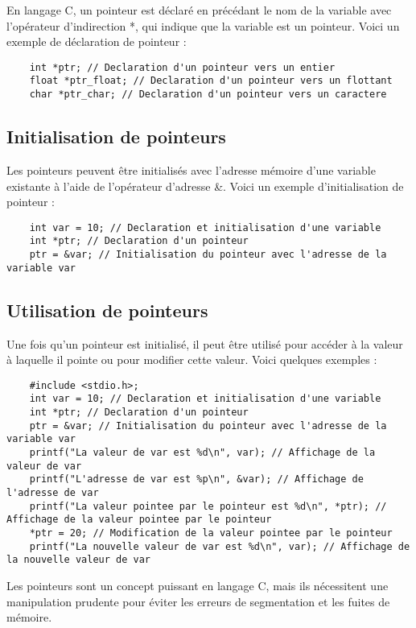 En langage C, un pointeur est déclaré en précédant le nom de la variable avec l'opérateur d'indirection *, qui indique que la variable est un pointeur. Voici un exemple de déclaration de pointeur :

\begin{lstlisting}
	int *ptr; // Declaration d'un pointeur vers un entier
	float *ptr_float; // Declaration d'un pointeur vers un flottant
	char *ptr_char; // Declaration d'un pointeur vers un caractere
\end{lstlisting}

\subsection{Initialisation de pointeurs}

Les pointeurs peuvent être initialisés avec l'adresse mémoire d'une variable existante à l'aide de l'opérateur d'adresse \&. Voici un exemple d'initialisation de pointeur :

\begin{lstlisting}
	int var = 10; // Declaration et initialisation d'une variable
	int *ptr; // Declaration d'un pointeur
	ptr = &var; // Initialisation du pointeur avec l'adresse de la variable var
\end{lstlisting}

\subsection{Utilisation de pointeurs}

Une fois qu'un pointeur est initialisé, il peut être utilisé pour accéder à la valeur à laquelle il pointe ou pour modifier cette valeur. Voici quelques exemples :

\begin{lstlisting}
	#include <stdio.h>;
	int var = 10; // Declaration et initialisation d'une variable
	int *ptr; // Declaration d'un pointeur
	ptr = &var; // Initialisation du pointeur avec l'adresse de la variable var
	printf("La valeur de var est %d\n", var); // Affichage de la valeur de var
	printf("L'adresse de var est %p\n", &var); // Affichage de l'adresse de var
	printf("La valeur pointee par le pointeur est %d\n", *ptr); // Affichage de la valeur pointee par le pointeur
	*ptr = 20; // Modification de la valeur pointee par le pointeur
	printf("La nouvelle valeur de var est %d\n", var); // Affichage de la nouvelle valeur de var
\end{lstlisting}

Les pointeurs sont un concept puissant en langage C, mais ils nécessitent une manipulation prudente pour éviter les erreurs de segmentation et les fuites de mémoire.



